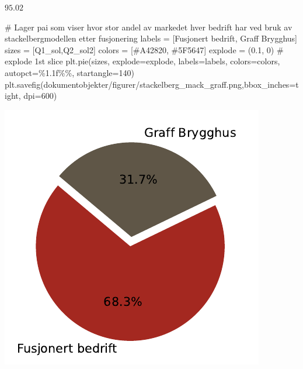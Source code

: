 \documentclass[
  12pt,
  a4paper,
  DIV=11,
  numbers=noendperiod]{scrartcl}
\newenvironment{Shaded}{\begin{snugshade}}{\end{snugshade}}
\newcommand{\CommentTok}[1]{\textcolor[rgb]{0.37,0.37,0.37}{#1}}
\newcommand{\DecValTok}[1]{\textcolor[rgb]{0.68,0.00,0.00}{#1}}
\newcommand{\FloatTok}[1]{\textcolor[rgb]{0.68,0.00,0.00}{#1}}
\newcommand{\NormalTok}[1]{\textcolor[rgb]{0.00,0.23,0.31}{#1}}
\newcommand{\OperatorTok}[1]{\textcolor[rgb]{0.37,0.37,0.37}{#1}}
\newcommand{\SpecialCharTok}[1]{\textcolor[rgb]{0.37,0.37,0.37}{#1}}
\newcommand{\StringTok}[1]{\textcolor[rgb]{0.13,0.47,0.30}{#1}}
\begin{document}
$\displaystyle 95.02$

\begin{Shaded}
\begin{Highlighting}[]
\CommentTok{\# Lager pai som viser hvor stor andel av markedet hver bedrift har ved bruk av stackelbergmodellen etter fusjonering}
\NormalTok{labels }\OperatorTok{=}\NormalTok{ [}\StringTok{\textquotesingle{}Fusjonert bedrift\textquotesingle{}}\NormalTok{, }\StringTok{\textquotesingle{}Graff Brygghus\textquotesingle{}}\NormalTok{]}
\NormalTok{sizes }\OperatorTok{=}\NormalTok{ [Q1\_sol,Q2\_sol2]}
\NormalTok{colors }\OperatorTok{=}\NormalTok{ [}\StringTok{\textquotesingle{}\#A42820\textquotesingle{}}\NormalTok{, }\StringTok{\textquotesingle{}\#5F5647\textquotesingle{}}\NormalTok{]}
\NormalTok{explode }\OperatorTok{=}\NormalTok{ (}\FloatTok{0.1}\NormalTok{, }\DecValTok{0}\NormalTok{)  }\CommentTok{\# explode 1st slice}
\NormalTok{plt.pie(sizes, explode}\OperatorTok{=}\NormalTok{explode, labels}\OperatorTok{=}\NormalTok{labels, colors}\OperatorTok{=}\NormalTok{colors, autopct}\OperatorTok{=}\StringTok{\textquotesingle{}}\SpecialCharTok{\%1.1f\%\%}\StringTok{\textquotesingle{}}\NormalTok{, startangle}\OperatorTok{=}\DecValTok{140}\NormalTok{)}
\NormalTok{plt.savefig(}\StringTok{\textquotesingle{}dokumentobjekter/figurer/stackelberg\_mack\_graff.png\textquotesingle{}}\NormalTok{,bbox\_inches}\OperatorTok{=}\StringTok{\textquotesingle{}tight\textquotesingle{}}\NormalTok{, dpi}\OperatorTok{=}\DecValTok{600}\NormalTok{)}
\end{Highlighting}
\end{Shaded}

\includegraphics{Kandidatnummer_30_mappeoppgave_2_SOK_2030_files/figure-pdf/cell-41-output-1.pdf}
\end{document}

